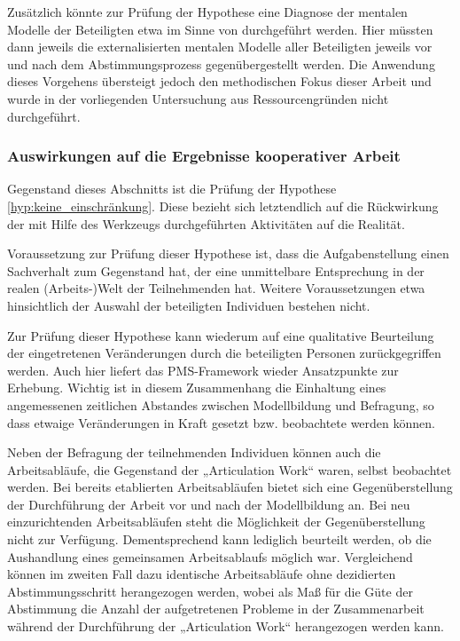 Zusätzlich könnte zur Prüfung der Hypothese eine Diagnose der mentalen Modelle der Beteiligten etwa im Sinne von \citep{Ifenthaler06} durchgeführt werden. Hier müssten dann jeweils die externalisierten mentalen Modelle aller Beteiligten jeweils vor und nach dem Abstimmungsprozess gegenübergestellt werden. Die Anwendung dieses Vorgehens übersteigt jedoch den methodischen Fokus dieser Arbeit und wurde in der vorliegenden Untersuchung aus Ressourcengründen nicht durchgeführt.


\subsubsection{Auswirkungen auf die Ergebnisse kooperativer Arbeit} %
\label{ssub:auswirkungen_auf_die_ergebnisse_kooperativer_arbeit}

Gegenstand dieses Abschnitts ist die Prüfung der Hypothese \ref{hyp:keine_einschränkung}. Diese bezieht sich letztendlich auf die Rückwirkung der mit Hilfe des Werkzeugs durchgeführten Aktivitäten auf die Realität.

Voraussetzung zur Prüfung dieser Hypothese ist, dass die Aufgabenstellung einen Sachverhalt zum Gegenstand hat, der eine unmittelbare Entsprechung in der realen (Arbeits-)Welt der Teilnehmenden hat. Weitere Voraussetzungen etwa hinsichtlich der Auswahl der beteiligten Individuen bestehen nicht.

Zur Prüfung dieser Hypothese kann wiederum auf eine qualitative Beurteilung der eingetretenen Veränderungen durch die beteiligten Personen zurückgegriffen werden. Auch hier liefert das \gls{PMS}-Framework \citep{Sedera02} wieder Ansatzpunkte zur Erhebung. Wichtig ist in diesem Zusammenhang die Einhaltung eines angemessenen zeitlichen Abstandes zwischen Modellbildung und Befragung, so dass etwaige Veränderungen in Kraft gesetzt bzw. beobachtete werden können.

Neben der Befragung der teilnehmenden Individuen können auch die Arbeitsabläufe, die Gegenstand der „Articulation Work“ waren, selbst beobachtet werden. Bei bereits etablierten Arbeitsabläufen bietet sich eine Gegenüberstellung der Durchführung der Arbeit vor und nach der Modellbildung an. Bei neu einzurichtenden Arbeitsabläufen steht die Möglichkeit der Gegenüberstellung nicht zur Verfügung. Dementsprechend kann lediglich beurteilt werden, ob die Aushandlung eines gemeinsamen Arbeitsablaufs möglich war. Vergleichend können im zweiten Fall dazu identische Arbeitsabläufe ohne dezidierten Abstimmungsschritt herangezogen werden, wobei als Maß für die Güte der Abstimmung die Anzahl der aufgetretenen Probleme in der Zusammenarbeit während der Durchführung der „Articulation Work“ herangezogen werden kann.

